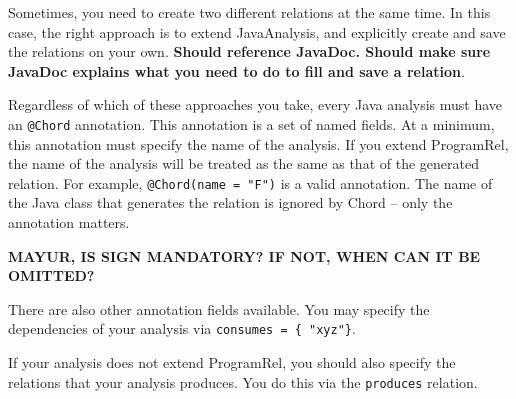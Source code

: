 Sometimes, you need to create two different relations at the same time. In this case, the right approach is to
extend JavaAnalysis, and explicitly create and save the relations on your own.
\textbf{Should reference JavaDoc.  Should make sure JavaDoc explains what you need to do to fill and save a relation}.

Regardless of which of these approaches you take, every Java analysis must have an \texttt{@Chord} annotation.
This annotation is a set of named fields.
At a minimum, this annotation must specify the name of the analysis.
If you extend ProgramRel, the name of the analysis will be treated as the same as that of the generated relation.
For example, \texttt{@Chord(name = "F")} is a valid annotation. 
The name of the Java class that generates the relation is ignored by Chord -- only the annotation matters.

\textbf{MAYUR, IS SIGN MANDATORY?   IF NOT, WHEN CAN IT BE OMITTED?}

There are also other annotation fields available.
You may specify the dependencies of your analysis via \texttt{consumes = \{ "xyz"\}}.

If your analysis does not extend ProgramRel, you should also specify the relations that your 
analysis produces. You do this via the \texttt{produces} relation.

%
%
